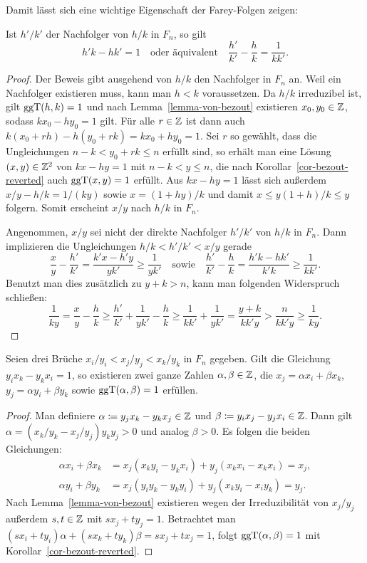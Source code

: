 Damit lässt sich eine wichtige Eigenschaft der Farey-Folgen zeigen:
\begin{lemma}\label{lemma-basic-property-farey-successor}
	Ist $h'/k'$ der Nachfolger von $h/k$ in $F_n$, so gilt \[
	h'k - hk' = 1 \text{~~~oder äquivalent~~~} \frac{h'}{k'} - \frac{h}{k} = \frac{1}{kk'}.
	\]
\end{lemma}
\begin{proof}
	Der Beweis gibt ausgehend von $h/k$ den Nachfolger in $F_n$ an.
	Weil ein Nachfolger existieren muss, kann man $h<k$ voraussetzen.
	Da $h/k$ irreduzibel ist, gilt $\operatorname{ggT}(h,k)= 1$ und nach Lemma~\ref{lemma-von-bezout} existieren $x_0, y_0\in\mathbb{Z}$, sodass $kx_0 -hy_0 = 1$ gilt.
	Für alle $r\in\mathbb{Z}$ ist dann auch $k(x_0 + rh) - h(y_0 + rk) = k x_0 + hy_0 = 1$.
	Sei $r$ so gewählt, dass die Ungleichungen $n-k<y_0 +rk \leq n$ erfüllt sind, so erhält man eine Lösung $(x,y)\in\mathbb{Z}^2$ von $kx - hy = 1$ mit $n-k<y\leq n$, die nach Korollar~\ref{cor-bezout-reverted} auch $\operatorname{ggT}(x,y)=1$ erfüllt.
	Aus $kx-hy=1$ lässt sich außerdem $x/y - h/k = 1/(ky)$ sowie $x = (1+hy)/k$ und damit $x \leq y(1+h)/k \leq y$ folgern.
	Somit erscheint $x/y$ nach $h/k$ in $F_n$.
	
	Angenommen, $x/y$ sei nicht der direkte Nachfolger $h'/k'$ von $h/k$ in $F_n$.
	Dann implizieren die Ungleichungen $h/k < h'/k' < x/y$ gerade \[
	\frac{x}{y} - \frac{h'}{k'} = \frac{k'x-h'y}{yk'} \geq \frac{1}{yk'}\text{~~~sowie~~~} \frac{h'}{k'} - \frac{h}{k} = \frac{h'k - hk'}{k'k} \geq \frac{1}{kk'}. \]
	Benutzt man dies zusätzlich zu $y+k > n$, kann man folgenden Widerspruch schließen:
	\[
		\frac{1}{ky} = \frac{x}{y} - \frac{h}{k} \geq \frac{h'}{k'} + \frac{1}{yk'}- \frac{h}{k} \geq \frac{1}{kk'} + \frac{1}{yk'} = \frac{y+k}{kk'y} > \frac{n}{kk'y} \geq \frac{1}{ky}.
	\]
\end{proof}

\begin{lemma}\label{lemma-farey-middle-member}
	Seien drei Brüche $x_i/y_i < x_j / y_j < x_k / y_k$ in $F_n$ gegeben.
	Gilt die Gleichung $y_i x_k - y_k x_i = 1$, so existieren zwei ganze Zahlen $\alpha,\beta\in\mathbb{Z}$, die $x_j = \alpha x_i + \beta x_k$, $y_j = \alpha y_i + \beta y_k$ sowie $\operatorname{ggT}(\alpha, \beta)=1$ erfüllen.
\end{lemma}
\begin{proof}
	Man definiere $\alpha\coloneq y_j x_k - y_k x_j\in\mathbb{Z}$ und $\beta\coloneq y_i x_j - y_j x_i\in\mathbb{Z}$.
	Dann gilt $\alpha = (x_k/y_k - x_j/y_j)y_k y_j > 0$ und analog $\beta > 0$.
	Es folgen die beiden Gleichungen:
	\begin{align*}
	\alpha x_i + \beta x_k &= x_j(x_k y_i - y_k x_i ) + y_j (x_k x_i - x_k x_i) = x_j, \\[1em]
	\alpha y_i + \beta y_k &= x_j (y_i y_k - y_k y_i) + y_j (x_k y_i - x_i y_k) = y_j.
	\end{align*}
	Nach Lemma~\ref{lemma-von-bezout} existieren wegen der Irreduzibilität von $x_j/y_j$ außerdem $s,t\in\mathbb{Z}$ mit $sx_j + ty_j = 1$.
	Betrachtet man $(sx_i + ty_i)\alpha + (sx_k + ty_k)\beta = s x_j + t x_j = 1$, folgt $\operatorname{ggT}(\alpha, \beta) = 1$ mit Korollar~\ref{cor-bezout-reverted}.
\end{proof}

